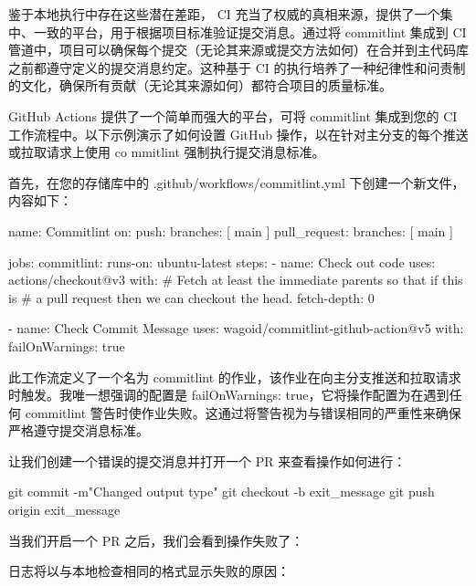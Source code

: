 鉴于本地执行中存在这些潜在差距， CI 充当了权威的真相来源，提供了一个集中、一致的平台，用于根据项目标准验证提交消息。通过将 commitlint 集成到 CI 管道中，项目可以确保每个提交（无论其来源或提交方法如何）在合并到主代码库之前都遵守定义的提交消息约定。这种基于 CI 的执行培养了一种纪律性和问责制的文化，确保所有贡献（无论其来源如何）都符合项目的质量标准。


GitHub Actions 提供了一个简单而强大的平台，可将 commitlint 集成到您的 CI 工作流程中。以下示例演示了如何设置 GitHub 操作，以在针对主分支的每个推送或拉取请求上使用 co mmitlint 强制执行提交消息标准。

首先，在您的存储库中的 .github/workflows/commitlint.yml 下创建一个新文件，内容如下：

\begin{shell}
name: Commitlint
on:
    push:
        branches: [ main ]
    pull_request:
        branches: [ main ]

jobs:
    commitlint:
        runs-on: ubuntu-latest
        steps:
        - name: Check out code
            uses: actions/checkout@v3
            with:
                # Fetch at least the immediate parents so that if this is
                # a pull request then we can checkout the head.
                fetch-depth: 0

        - name: Check Commit Message
            uses: wagoid/commitlint-github-action@v5
            with:
                failOnWarnings: true
\end{shell}

此工作流定义了一个名为 commitlint 的作业，该作业在向主分支推送和拉取请求时触发。我唯一想强调的配置是 failOnWarnings: true，它将操作配置为在遇到任何 commitlint 警告时使作业失败。这通过将警告视为与错误相同的严重性来确保严格遵守提交消息标准。

让我们创建一个错误的提交消息并打开一个 PR 来查看操作如何进行：

\begin{shell}
git commit -m"Changed output type"
git checkout -b exit_message
git push origin exit_message
\end{shell}

当我们开启一个 PR 之后，我们会看到操作失败了：


日志将以与本地检查相同的格式显示失败的原因：


